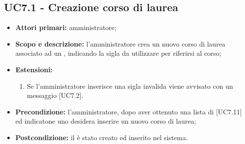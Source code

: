 \documentclass[AnalisiDeiRequisiti.tex]{subfiles}
\begin{document}
\subsection{UC7.1 - Creazione corso di laurea}
\begin{itemize}
	\item \textbf{Attori primari:} amministratore;
	\item \textbf{Scopo e descrizione:} l'amministratore crea un nuovo corso di laurea associato ad un , indicando la sigla da utilizzare per riferirsi al corso;
	\item \textbf{Estensioni:}
		\begin{enumerate}
			\item Se l'amministratore inserisce una sigla invalida viene avvisato con un messaggio [UC7.2].
		\end{enumerate}
	\item \textbf{Precondizione:} l'amministratore, dopo aver ottenuto una lista di  [UC7.11] ed indicatone uno desidera inserire un nuovo corso di laurea; 
	\item \textbf{Postcondizione:} il  è stato creato ed inserito nel sistema.
\end{itemize}
\end{document}
